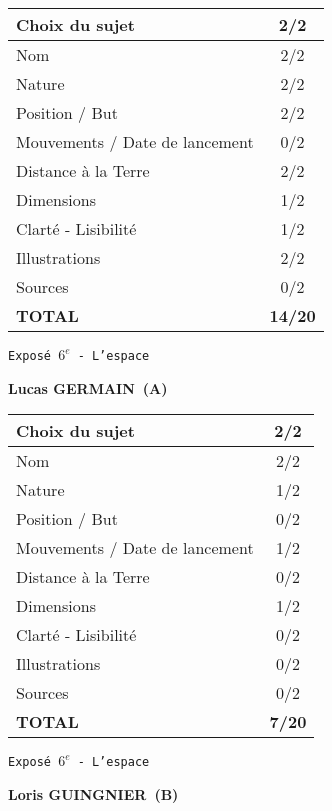 	\vspace*{2cm}
	\begin{tabular}{|l|c|}
		\hline
		Choix du sujet & 2/2 \\
		\hline
		Nom & 2/2 \\
		\hline
		Nature & 2/2 \\
		\hline
		Position / But & 2/2 \\
		\hline
		Mouvements / Date de lancement & 0/2 \\
		\hline
		Distance \`a la Terre & 2/2 \\
		\hline
		Dimensions & 1/2 \\
		\hline
		Clart\'e - Lisibilit\'e & 1/2 \\
		\hline
		Illustrations & 2/2 \\
		\hline
		Sources & 0/2 \\
		\hline
		\textbf{TOTAL}  & \textbf{14/20} \\
		\hline
	\end{tabular}
	\newline
	\LARGE{\texttt{Expos\'e $6^e$ - L'espace}}
	\vspace*{1cm}

	\textbf{Lucas GERMAIN\ (A)}

	\vspace*{2cm}
	\begin{tabular}{|l|c|}
		\hline
		Choix du sujet & 2/2 \\
		\hline
		Nom & 2/2 \\
		\hline
		Nature & 1/2 \\
		\hline
		Position / But & 0/2 \\
		\hline
		Mouvements / Date de lancement & 1/2 \\
		\hline
		Distance \`a la Terre & 0/2 \\
		\hline
		Dimensions & 1/2 \\
		\hline
		Clart\'e - Lisibilit\'e & 0/2 \\
		\hline
		Illustrations & 0/2 \\
		\hline
		Sources & 0/2 \\
		\hline
		\textbf{TOTAL}  & \textbf{7/20} \\
		\hline
	\end{tabular}
	\newline
	\LARGE{\texttt{Expos\'e $6^e$ - L'espace}}
	\vspace*{1cm}

	\textbf{Loris GUINGNIER\ (B)}

